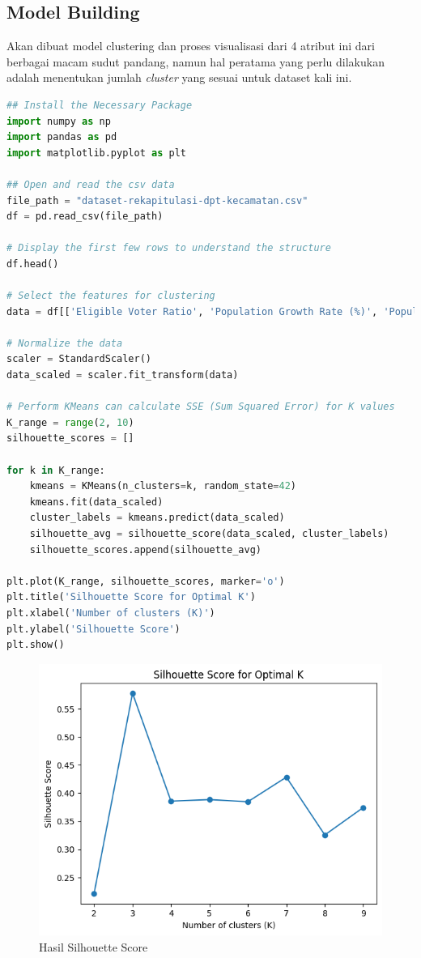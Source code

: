 \subsection{Model Building}
Akan dibuat model clustering dan proses visualisasi dari 4 atribut ini dari berbagai macam sudut pandang, namun hal peratama yang perlu dilakukan adalah menentukan jumlah \textit{cluster} yang sesuai untuk dataset kali ini.

\begin{lstlisting}[language=Python, caption=Program kode untuk menentukan Silhouette Score,label={lst:silhouette_method}]
## Install the Necessary Package
import numpy as np
import pandas as pd
import matplotlib.pyplot as plt

## Open and read the csv data
file_path = "dataset-rekapitulasi-dpt-kecamatan.csv"
df = pd.read_csv(file_path)

# Display the first few rows to understand the structure
df.head()

# Select the features for clustering
data = df[['Eligible Voter Ratio', 'Population Growth Rate (%)', 'Population Density', 'Voter Gender Ratio']]

# Normalize the data
scaler = StandardScaler()
data_scaled = scaler.fit_transform(data)

# Perform KMeans can calculate SSE (Sum Squared Error) for K values
K_range = range(2, 10)
silhouette_scores = []

for k in K_range:
    kmeans = KMeans(n_clusters=k, random_state=42)
    kmeans.fit(data_scaled)
    cluster_labels = kmeans.predict(data_scaled)
    silhouette_avg = silhouette_score(data_scaled, cluster_labels)
    silhouette_scores.append(silhouette_avg)

plt.plot(K_range, silhouette_scores, marker='o')
plt.title('Silhouette Score for Optimal K')
plt.xlabel('Number of clusters (K)')
plt.ylabel('Silhouette Score')
plt.show()
\end{lstlisting}

\begin{figure}[h]
    \centering
    \includegraphics[width=0.5\linewidth]{images/optimal_cluster.png}
    \caption{Hasil Silhouette Score}
    \label{fig:silhouette_score}
\end{figure}

